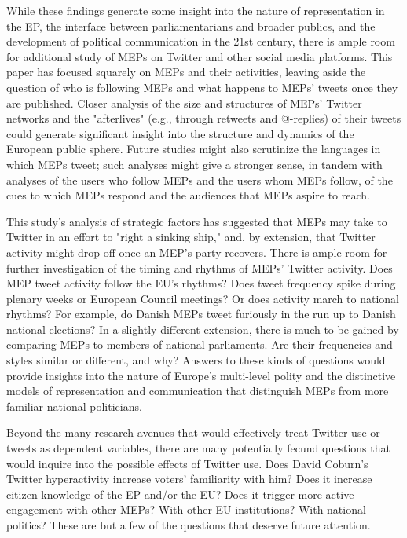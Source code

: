 \documentclass[12pt]{article}\usepackage[]{graphicx}\usepackage[]{color}
\begin{document}
	 While these findings generate some insight into the nature of representation in the EP, the interface between parliamentarians and broader publics, and the development of political communication in the 21st century, there is ample room for additional study of MEPs on Twitter and other social media platforms. This paper has focused squarely on MEPs and their activities, leaving aside the question of who is following MEPs and what happens to MEPs' tweets once they are published. Closer analysis of the size and structures of MEPs' Twitter networks and the "afterlives" (e.g., through retweets and @-replies) of their tweets could generate significant insight into the structure and dynamics of the European public sphere. Future studies might also scrutinize the languages in which MEPs tweet; such analyses might give a stronger sense, in tandem with analyses of the users who follow MEPs and the users whom MEPs follow, of the cues to which MEPs respond and the audiences that MEPs aspire to reach.  
	 
	 This study's analysis of strategic factors has suggested that MEPs may take to Twitter in an effort to "right a sinking ship," and, by extension, that Twitter activity might drop off once an MEP's party recovers. There is ample room for further investigation of the timing and rhythms of MEPs' Twitter activity. Does MEP tweet activity follow the EU's rhythms? Does tweet frequency spike during plenary weeks or European Council meetings? Or does activity march to national rhythms? For example, do Danish MEPs tweet furiously in the run up to Danish national elections? In a slightly different extension, there is much to be gained by comparing MEPs to members of national parliaments.  Are their frequencies and styles similar or different, and why?  Answers to these kinds of questions would provide insights into the nature of Europe's multi-level polity and the distinctive models of representation and communication that distinguish MEPs from more familiar national politicians.
	 
	 Beyond the many research avenues that would effectively treat Twitter use or tweets as dependent variables, there are many potentially fecund questions that would inquire into the possible effects of Twitter use.  Does David Coburn's Twitter hyperactivity increase voters' familiarity with him? Does it increase citizen knowledge of the EP and/or the EU? Does it trigger more active engagement with other MEPs? With other EU institutions? With national politics? These are but a few of the questions that deserve future attention. 
\end{document}
